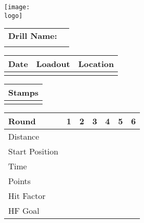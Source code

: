 \documentclass[../Cover.tex]{subfiles}
\begin{document}
	\begin{minipage}[t][0.15\textheight][t]{0.1\textwidth} 
		\texttt{[image: \\logo]}
	\end{minipage}
	\hfill
	\begin{minipage}[t][0.15\textheight][t]{0.8\textwidth}
		\begin{tabular}{ p{} l  }
			\\		
			\textbf{Drill Name:} \\
			\\[0.03\textheight]
			\hline
		\end{tabular}
		\quad
		\small \begin{tabular}{ | p{} | p{} | p{} |}
			\hline
			\rowcolor[HTML]{C0C0C0}Date & Loadout & Location\\ 
			\hline
			&  &  \\ 
			\hline
		\end{tabular}
	\end{minipage}
	
	\begin{tabular}{p{}|}
		Stamps \\
		\hline
		\\[0.65\textheight]
	\end{tabular}
	\quad
	\begin{tabular}{ | p{} | p{} | p{} | p{} | p{} | p{} | p{} |}
		\hline
		\rowcolor[HTML]{C0C0C0}Round & 1 & 2 & 3 & 4 & 5 & 6 \\
		\hline
		\cellcolor[HTML]{C0C0C0}\tiny Distance & & & & & & \\[0.05\textheight]
		\hline
		\cellcolor[HTML]{C0C0C0}\tiny Start Position & & & & & & \\[0.05\textheight]
		\hline
		\cellcolor[HTML]{C0C0C0}\tiny Time & & & & & & \\[0.05\textheight]
		\hline
		\cellcolor[HTML]{C0C0C0}\tiny Points & & & & & & \\[0.05\textheight]
		\hline
		\cellcolor[HTML]{C0C0C0}\tiny Hit Factor & & & & & & \\[0.05\textheight]
		\hline
		\cellcolor[HTML]{C0C0C0}\tiny HF Goal & & & & & & \\[0.05\textheight]
		\hline
	\end{tabular}
\end{document}
